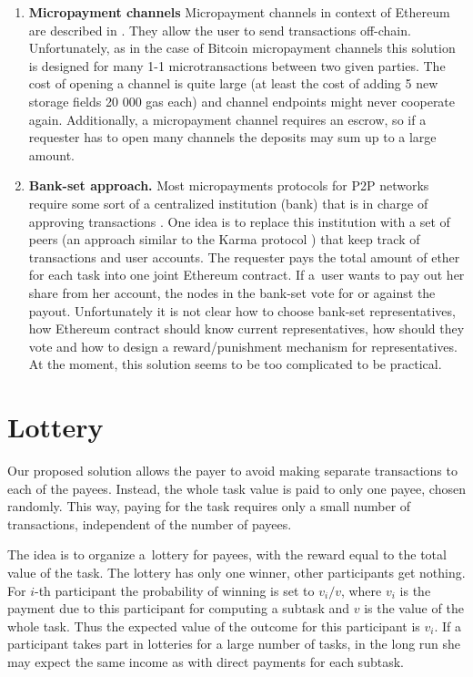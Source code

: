 \documentclass[a4paper]{article}
\begin{document}
    \begin{enumerate}
	    \item \textbf{Micropayment channels}
        Micropayment channels in context of Ethereum are described in \cite{BUTERIN}. They allow the user to send
        transactions off-chain. Unfortunately, as in the case of Bitcoin micropayment channels \cite{BITCOINJ} this
        solution is designed for many 1-1 microtransactions between two given parties. The cost of opening a channel
        is quite large (at least the cost of adding 5 new storage fields 20 000 gas each) and channel endpoints might
        never cooperate again. Additionally, a micropayment channel requires an escrow, so if a requester has to open
        many channels the deposits may sum up to a large amount.
	\item \textbf{Bank-set approach.}
        Most micropayments protocols for P2P networks require some sort of a centralized institution (bank) that is
        in charge of approving transactions \cite{JAIN}. One idea is to replace this institution with a set of peers
        (an approach similar to the Karma protocol \cite{VISHNUMURTHY}) that keep track of transactions and user accounts.
        The requester pays the total amount of ether for each task into one joint Ethereum contract.
        If a~user wants to pay out her share from her account, the nodes in the bank-set vote for or against the payout.
        Unfortunately it is not clear how to choose bank-set representatives, how Ethereum contract should know
        current representatives, how should they vote and how to design a reward/punishment mechanism
        for representatives. At the moment, this solution seems to be too complicated to be practical.

\end{enumerate}
\section{Lottery}
\label{sec:lottery}

    Our proposed solution allows the payer to avoid making separate transactions to each of the payees. Instead,
    the whole task value is paid to only one payee, chosen randomly. This way, paying for the task requires only
    a small number of transactions, independent of the number of payees.

    The idea is to organize a~lottery for payees, with the reward equal to the total value of the task. The lottery
    has only one winner, other participants get nothing. For $i$-th participant the probability of winning is set to
    $v_i / v$, where $v_i$ is the payment due to this participant for computing a subtask and $v$ is the value of the
    whole task. Thus the expected value of the outcome for this participant is $v_i$. If a participant takes part in
    lotteries for a large number of tasks, in the long run she may expect the same income as with direct payments for
    each subtask.
\end{document}
